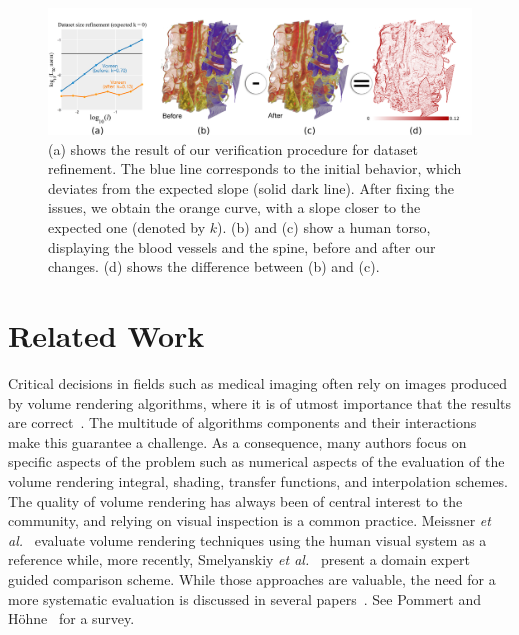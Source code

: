 \begin{figure}[t]
\centering
\includegraphics[width=1\linewidth]{chapter5/figures/teaser.png}
\caption{\label{chap5:fig:teaser} (a) shows the result of our verification procedure
  for dataset refinement. The
  blue line corresponds to the initial behavior, which deviates from
  the expected slope (solid dark line).  After fixing
  the issues, we obtain the orange curve, with a slope closer to the
  expected one (denoted by $k$). (b) and (c) show a
  human torso, displaying the blood vessels and the spine, before and
  after our changes.  (d) shows the difference between (b) and (c).}
\end{figure}

\section{Related Work}
\label{sec:related-works}

Critical decisions in fields such as medical imaging often rely on
images produced by volume rendering algorithms, where it is of utmost
importance that the results are correct~\cite{Duncan2000}.  The
multitude of algorithms components and their interactions make
this guarantee a challenge. As a consequence, many authors focus on specific
aspects of the problem such as numerical aspects of the evaluation of
the volume rendering integral, shading, transfer functions, and
interpolation schemes.  The quality of volume rendering has always
been of central interest to the community, and relying on visual
inspection is a common practice. Meissner \emph{et
al.}~\cite{Meissner:2000:PEP:353888.353903} evaluate volume rendering
techniques using the human visual system as a reference while, more
recently, Smelyanskiy \emph{et
al.}~\cite{Smelyanskiy:2009:MHV:1638611.1639155} present a domain expert guided comparison scheme.
While those approaches are valuable, the need for a more systematic
evaluation is discussed in several
papers~\cite{globus95,Johnson:2004:TSV:1018014.1018051,Johnson:2003:NSV:942583.942610,kirby-vv-08}. See Pommert and
H\"{o}hne~\cite{Pommert2002,Pommert2003} for a survey.

